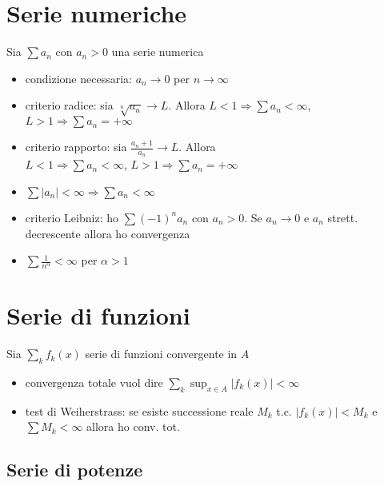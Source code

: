 \documentclass[a4paper,portrait,columns=3,5pt]{cheatsheet}
\begin{document}
\section{Serie numeriche}
Sia $\sum a_n$ con $a_n > 0$ una serie numerica
\begin{itemize}
    \item condizione necessaria: $a_n \rightarrow 0$ per $n \rightarrow \infty$
    \item criterio radice: sia $ \sqrt[n]{a_n} \rightarrow L$. Allora $L<1 \Rightarrow \sum a_n< \infty$, $L>1 \Rightarrow \sum a_n = + \infty$
    \item criterio rapporto: sia $\frac{a_n+1}{a_n} \rightarrow L$. Allora \\$L<1 \Rightarrow \sum a_n< \infty$, $L>1 \Rightarrow \sum a_n = + \infty$
    \item $\sum \left| a_n \right| < \infty \Rightarrow \sum a_n< \infty$
    \item criterio Leibniz: ho $\sum (-1)^n a_n$ con $a_n > 0$. Se $a_n \rightarrow 0$ e $a_n$ strett. decrescente allora ho convergenza
    \item $\sum \frac{1}{n^\alpha} < \infty$ per $\alpha > 1$
    
\end{itemize}

\section{Serie di funzioni}
Sia $\sum_k f_k(x)$ serie di funzioni convergente in $A$
\begin{itemize}
    \item convergenza totale vuol dire $\sum_k \sup_{x \in A} \left|f_k(x)\right| < \infty$
    \item test di Weiherstrass: se esiste successione reale $M_k$ t.c. $\left|f_k(x)\right| < M_k$ e $\sum M_k < \infty$ allora ho conv. tot.
\end{itemize}
\subsection{Serie di potenze}
\end{document}
